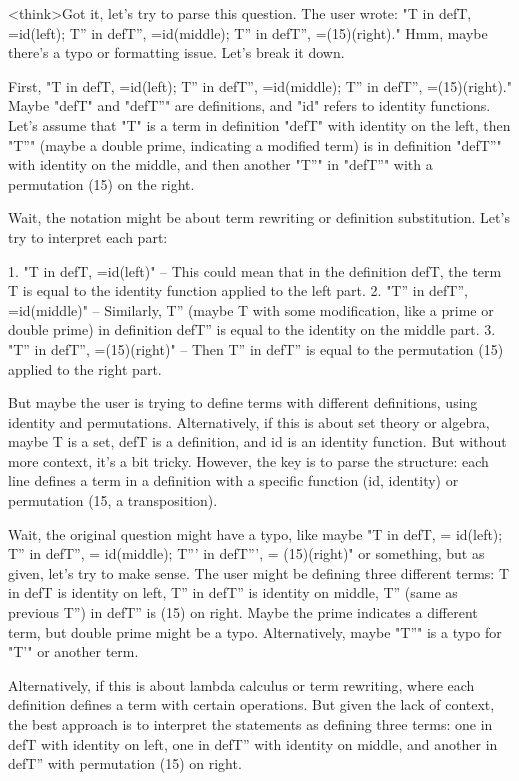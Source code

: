 <think>Got it, let's try to parse this question. The user wrote: "T in defT, =id(left); T'' in defT'', =id(middle); T'' in defT'', =(15)(right)." Hmm, maybe there's a typo or formatting issue. Let's break it down. 

First, "T in defT, =id(left); T'' in defT'', =id(middle); T'' in defT'', =(15)(right)." Maybe "defT" and "defT''" are definitions, and "id" refers to identity functions. Let's assume that "T" is a term in definition "defT" with identity on the left, then "T''" (maybe a double prime, indicating a modified term) is in definition "defT''" with identity on the middle, and then another "T''" in "defT''" with a permutation (15) on the right. 

Wait, the notation might be about term rewriting or definition substitution. Let's try to interpret each part:

1. "T in defT, =id(left)" – This could mean that in the definition defT, the term T is equal to the identity function applied to the left part.
2. "T'' in defT'', =id(middle)" – Similarly, T'' (maybe T with some modification, like a prime or double prime) in definition defT'' is equal to the identity on the middle part.
3. "T'' in defT'', =(15)(right)" – Then T'' in defT'' is equal to the permutation (15) applied to the right part.

But maybe the user is trying to define terms with different definitions, using identity and permutations. Alternatively, if this is about set theory or algebra, maybe T is a set, defT is a definition, and id is an identity function. But without more context, it's a bit tricky. However, the key is to parse the structure: each line defines a term in a definition with a specific function (id, identity) or permutation (15, a transposition). 

Wait, the original question might have a typo, like maybe "T in defT, = id(left); T'' in defT'', = id(middle); T''' in defT''', = (15)(right)" or something, but as given, let's try to make sense. The user might be defining three different terms: T in defT is identity on left, T'' in defT'' is identity on middle, T'' (same as previous T'') in defT'' is (15) on right. Maybe the prime indicates a different term, but double prime might be a typo. Alternatively, maybe "T''" is a typo for "T'" or another term. 

Alternatively, if this is about lambda calculus or term rewriting, where each definition defines a term with certain operations. But given the lack of context, the best approach is to interpret the statements as defining three terms: one in defT with identity on left, one in defT'' with identity on middle, and another in defT'' with permutation (15) on right. 

